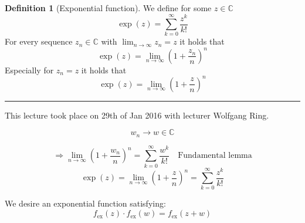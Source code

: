 \documentclass[a4paper,landscape,twocolumn]{article}
\theoremstyle{definition}
\newtheorem{defi}{Definition}
\newcommand\meta[3]{\hrule{} This #1 took place on #2 with lecturer #3.\par}
\begin{document}
\begin{defi}[Exponential function]
  We define for some $z \in \mathbb C$
  \[ \operatorname{exp}(z) = \sum_{k=0}^\infty \frac{z^k}{k!} \]
  For every sequence $z_n \in \mathbb C$ with $\lim_{n\to\infty} z_n = z$ it holds that
  \[ \operatorname{exp}(z) = \lim_{n\to\infty} \left(1 + \frac{z_n}{n}\right)^n \]
  Especially for $z_n = z$ it holds that
  \[ \operatorname{exp}(z) = \lim_{n\to\infty} \left(1 + \frac{z}{n}\right)^n \]
\end{defi}

\meta{lecture}{29th of Jan 2016}{Wolfgang Ring}

\[ w_n \to w \in \mathbb C \]

\[
  \Rightarrow \lim_{n\to\infty} \left(1 + \frac{w_n}{n}\right)^n
  = \sum_{k=0}^\infty \frac{w^k}{k!}
  \quad \text{Fundamental lemma}
\] \[
  \exp(z)
  = \lim_{n\to\infty} \left(1 + \frac zn\right)^n
  = \sum_{k=0}^\infty \frac{z^k}{k!}
\]

We desire an exponential function satisfying:
\[ f_{\text{ex}}(z) \cdot f_{\text{ex}}(w) = f_{\text{ex}}(z + w) \]
\end{document}
